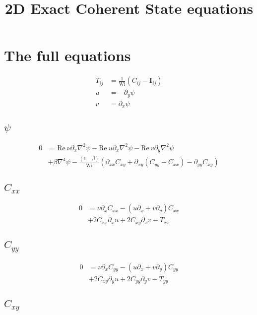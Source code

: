 \documentclass[12,a4paper]{article}
\newcommand{\dd}[1]{\partial_{#1}}
\newcommand{\lpl}{\nabla^{2}}
\newcommand{\bih}{\nabla^{4}}
\newcommand{\Wi}{\mathrm{Wi}}
\newcommand{\Rey}{\mathrm{Re \ }}
\newcommand{\II}{\mathbf{I}}
\begin{document}
\title{2D Exact Coherent State equations}
\maketitle

\section{The full equations}
\begin{align}
    T_{ij} &= \frac{1}{\Wi} (C_{ij} - \II_{ij}) \\
    u	   &= -\dd{y} \psi \\
    v	   &= \dd{x} \psi
\end{align}

\subsection{$\psi$}

\begin{align}
    0 &= \Rey\nu\dd{x}\lpl\psi - \Rey u \dd{x} \lpl \psi - \Rey v \dd{y} \lpl \psi \nonumber\\
      &+ \beta \bih \psi - \frac{(1-\beta)}{\Wi} \left( \dd{xx} C_{xy} + \dd{xy}(C_{yy} - C_{xx}) - \dd{yy} C_{xy}\right)
\end{align}

\subsection{$C_{xx}$}

\begin{align}
    0 &= \nu \dd{x} C_{xx} - (u\dd{x} + v\dd{y}) C_{xx} \nonumber\\
      &+ 2C_{xx}\dd{x}u + 2C_{xy}\dd{x}v -  T_{xx}
\end{align}

\subsection{$C_{yy}$}

\begin{align}
    0 &= \nu \dd{x} C_{yy} - (u\dd{x} + v\dd{y}) C_{yy} \nonumber\\
    &+ 2C_{xy} \dd{y}u + 2C_{yy}\dd{y}v - T_{yy}
\end{align}

\subsection{$C_{xy}$}
\end{document}
